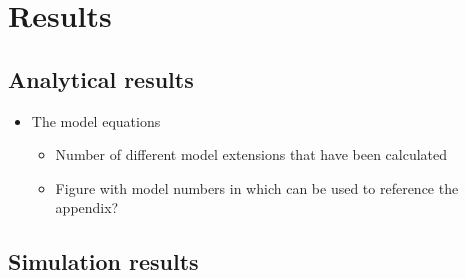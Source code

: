 \documentclass[a4paper,10pt,reqno,oneside]{amsart}
\begin{document}
\section{Results}

\subsection{Analytical results}
\begin{itemize}
\item The model equations
	\begin{itemize}
	\item Number of different model extensions that have been calculated
	\item Figure with model numbers in which can be used to reference the appendix?
	\end{itemize}
\end{itemize}


\subsection{Simulation results}
\end{document}
